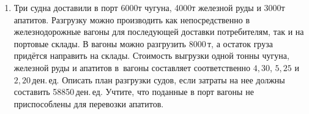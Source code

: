 \documentclass[a5paper,10pt]{extarticle}
\begin{document}
\begin{enumerate}
Найти количество сырья, которое следует переработать по каждой технологии, чтобы произвести 574~изделия~$A$ и~328~изделий~$B$ из 94\;ед. сырья.

\item 
	Три судна доставили в порт 6000\;т чугуна, 4000\;т железной руды и 3000\;т апатитов. Разгрузку можно производить как непосредственно в железнодорожные вагоны для последующей доставки потребителям, так и на портовые склады. В вагоны можно разгрузить 8000\,т, а остаток груза придётся направить на склады.  Стоимость выгрузки одной тонны чугуна, железной руды и апатитов в~вагоны составляет соответственно $4{,}30$, $5{,}25$ и $2{,}20$\,ден.\,ед.
Описать план разгрузки судов, если затраты на нее должны составить 58850\,ден.\,ед. Учтите, что поданные в порт вагоны не приспособлены для перевозки апатитов.

\end{enumerate}
\newpage
\end{document}
